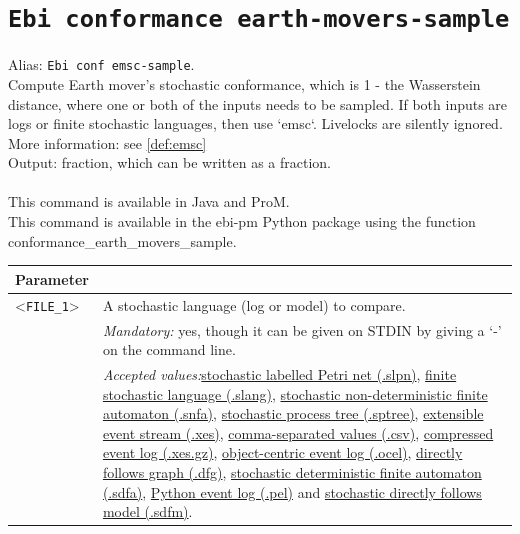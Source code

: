 {\clearpage\section{\texttt{Ebi conformance earth-movers-sample}}
\label{command:Ebi conformance earth-movers-sample}
Alias: \texttt{Ebi conf emsc-sample}.\\
Compute Earth mover's stochastic conformance, which is 1 - the Wasserstein distance, where one or both of the inputs needs to be sampled. 
        If both inputs are logs or finite stochastic languages, then use `emsc`.
        Livelocks are silently ignored.\\
More information: see \cref{def:emsc}~\\
\noindent Output: fraction, which can be written as a fraction.\\
\\This command is available in Java and ProM.
\\This command is available in the ebi-pm Python package using the function conformance\_earth\_movers\_sample.
\begin{tabularx}{\linewidth}{lX}
\toprule
Parameter \\\midrule
<\texttt{FILE\_1}>&A stochastic language (log or model) to compare.\\
&\textit{Mandatory:} \quad yes, though it can be given on STDIN by giving a `-' on the command line.\\
&\textit{Accepted values:}\quad \hyperref[filehandler:stochastic labelled Petri net]{stochastic labelled Petri net (.slpn)}, \hyperref[filehandler:finite stochastic language]{finite stochastic language (.slang)}, \hyperref[filehandler:stochastic non-deterministic finite automaton]{stochastic non-deterministic finite automaton (.snfa)}, \hyperref[filehandler:stochastic process tree]{stochastic process tree (.sptree)}, \hyperref[filehandler:extensible event stream]{extensible event stream (.xes)}, \hyperref[filehandler:comma-separated values]{comma-separated values (.csv)}, \hyperref[filehandler:compressed event log]{compressed event log (.xes.gz)}, \hyperref[filehandler:object-centric event log]{object-centric event log (.ocel)}, \hyperref[filehandler:directly follows graph]{directly follows graph (.dfg)}, \hyperref[filehandler:stochastic deterministic finite automaton]{stochastic deterministic finite automaton (.sdfa)}, \hyperref[filehandler:Python event log]{Python event log (.pel)} and \hyperref[filehandler:stochastic directly follows model]{stochastic directly follows model (.sdfm)}.\\

\end{tabularx}}
